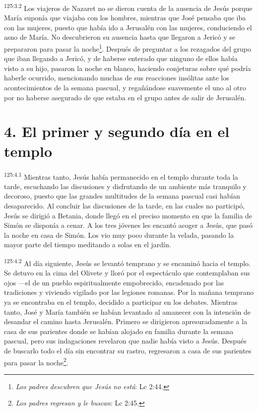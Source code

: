 \par 
\textsuperscript{125:3.2} Los viajeros de Nazaret no se dieron cuenta de la ausencia de Jesús porque María suponía que viajaba con los hombres, mientras que José pensaba que iba con las mujeres, puesto que había ido a Jerusalén con las mujeres, conduciendo el asno de María. No descubrieron su ausencia hasta que llegaron a Jericó y se prepararon para pasar la noche\footnote{\textit{Los padres descubren que Jesús no está}: Lc 2:44.}. Después de preguntar a los rezagados del grupo que iban llegando a Jericó, y de haberse enterado que ninguno de ellos había visto a su hijo, pasaron la noche en blanco, haciendo conjeturas sobre qué podría haberle ocurrido, mencionando muchas de sus reacciones insólitas ante los acontecimientos de la semana pascual, y regañándose suavemente el uno al otro por no haberse asegurado de que estaba en el grupo antes de salir de Jerusalén.

\section*{4. El primer y segundo día en el templo}
\par 
\textsuperscript{125:4.1} Mientras tanto, Jesús había permanecido en el templo durante toda la tarde, escuchando las discusiones y disfrutando de un ambiente más tranquilo y decoroso, puesto que las grandes multitudes de la semana pascual casi habían desaparecido. Al concluir las discusiones de la tarde, en las cuales no participó, Jesús se dirigió a Betania, donde llegó en el preciso momento en que la familia de Simón se disponía a cenar. A los tres jóvenes les encantó acoger a Jesús, que pasó la noche en casa de Simón. Los vio muy poco durante la velada, pasando la mayor parte del tiempo meditando a solas en el jardín.

\par 
\textsuperscript{125:4.2} Al día siguiente, Jesús se levantó temprano y se encaminó hacia el templo. Se detuvo en la cima del Olivete y lloró por el espectáculo que contemplaban sus ojos ---el de un pueblo espiritualmente empobrecido, encadenado por las tradiciones y viviendo vigilado por las legiones romanas. Por la mañana temprano ya se encontraba en el templo, decidido a participar en los debates. Mientras tanto, José y María también se habían levantado al amanecer con la intención de desandar el camino hasta Jerusalén. Primero se dirigieron apresuradamente a la casa de sus parientes donde se habían alojado en familia durante la semana pascual, pero sus indagaciones revelaron que nadie había visto a Jesús. Después de buscarlo todo el día sin encontrar su rastro, regresaron a casa de sus parientes para pasar la noche\footnote{\textit{Los padres regresan y le buscan}: Lc 2:45.}.

